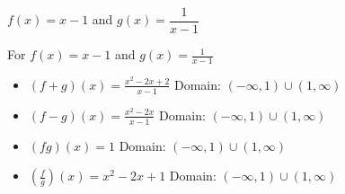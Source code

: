 {$f(x) =x-1$ and $g(x) = \dfrac{1}{x-1}$}
{For   $f(x) =x-1$ and $g(x) = \frac{1}{x-1}$

\begin{itemize}
\item $(f+g)(x) = \frac{x^2-2x+2}{x-1}$
      Domain: $(-\infty, 1) \cup (1, \infty)$
\item $(f-g)(x) = \frac{x^2-2x}{x-1}$
      Domain:  $(-\infty,1) \cup (1, \infty)$
\item $(fg)(x) = 1$
      Domain: $(-\infty,1) \cup (1, \infty)$
\item $\left(\frac{f}{g}\right)(x) =x^2-2x+1$ 
      Domain: $(-\infty,1) \cup (1, \infty)$
\end{itemize}
}
